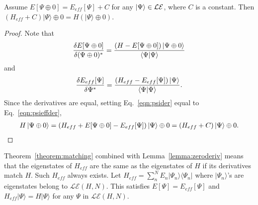 \begin{theorem}
\label{theorem:matching}
Assume $ E[\Psi\oplus 0]  = E_{eff}[\Psi]+C$ for any $\ket{\Psi } \in \mathcal{LE}$, where $C$ is a constant. 
Then $(H_{eff}+C)|\Psi\rangle\oplus 0 = H (|\Psi\rangle \oplus 0)$.
\end{theorem}
\begin{proof}
Note that
\begin{align}
	\frac{\delta E[\Psi\oplus 0]}{\delta (\Psi\oplus 0)^*}=\frac{(H-E[\Psi\oplus 0])\ket{\Psi\oplus 0} }{\braket{\Psi|\Psi}}
	\label{eqn:psider}
\end{align}
and 
\begin{align}
	\frac{\delta E_{eff}[\Psi]}{\delta \Psi^*}=\frac{(H_{eff}-E_{eff}[\Psi])\ket{\Psi} }{\braket{\Psi|\Psi}}.
	\label{eqn:psieffder}
\end{align}
Since the derivatives are equal, setting Eq.~\eqref{eqn:psider} equal to Eq.~\eqref{eqn:psieffder},
\begin{align}
	 H\ket{\Psi\oplus 0}= (H_{eff}+E[\Psi\oplus 0]-E_{eff}[\Psi])\ket{\Psi}\oplus 0 =(H_{eff}+C)\ket{\Psi}\oplus 0.
\end{align}
\end{proof}

Theorem~\ref{theorem:matching} combined with Lemma~\ref{lemma:zeroderiv} means that the eigenstates of $H_{eff}$ are the same as the eigenstates of $H$ if its derivatives match $H$. 
Such $H_{eff}$ always exists. 
Let $H_{eff} = \sum_{n}^N E_n |\Psi_n\rangle \langle \Psi_n|$ where $|\Psi_n\rangle$'s are eigenstates belong to $\mathcal{LE}(H,N)$. This satisfies $E[\Psi] = E_{eff}[\Psi]$ and $H_{eff}|\Psi\rangle = H |\Psi \rangle$ for any $\Psi$ in $\mathcal{LE}(H,N)$.  

